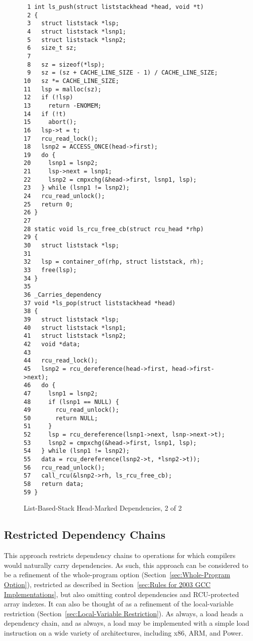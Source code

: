 \documentclass[letterpaper,twocolumn,10pt]{article}
\begin{document}
\begin{figure}[tbp]
{ \scriptsize
\begin{verbatim}
 1 int ls_push(struct liststackhead *head, void *t)
 2 {
 3   struct liststack *lsp;
 4   struct liststack *lsnp1;
 5   struct liststack *lsnp2;
 6   size_t sz;
 7 
 8   sz = sizeof(*lsp);
 9   sz = (sz + CACHE_LINE_SIZE - 1) / CACHE_LINE_SIZE;
10   sz *= CACHE_LINE_SIZE;
11   lsp = malloc(sz);
12   if (!lsp)
13     return -ENOMEM;
14   if (!t)
15     abort();
16   lsp->t = t;
17   rcu_read_lock();
18   lsnp2 = ACCESS_ONCE(head->first);
19   do {
20     lsnp1 = lsnp2;
21     lsp->next = lsnp1;
22     lsnp2 = cmpxchg(&head->first, lsnp1, lsp);
23   } while (lsnp1 != lsnp2);
24   rcu_read_unlock();
25   return 0;
26 }
27 
28 static void ls_rcu_free_cb(struct rcu_head *rhp)
29 {
30   struct liststack *lsp;
31 
32   lsp = container_of(rhp, struct liststack, rh);
33   free(lsp);
34 }
35 
36 _Carries_dependency
37 void *ls_pop(struct liststackhead *head)
38 {
39   struct liststack *lsp;
40   struct liststack *lsnp1;
41   struct liststack *lsnp2;
42   void *data;
43 
44   rcu_read_lock();
45   lsnp2 = rcu_dereference(head->first, head->first->next);
46   do {
47     lsnp1 = lsnp2;
48     if (lsnp1 == NULL) {
49       rcu_read_unlock();
50       return NULL;
51     }
52     lsp = rcu_dereference(lsnp1->next, lsnp->next->t);
53     lsnp2 = cmpxchg(&head->first, lsnp1, lsp);
54   } while (lsnp1 != lsnp2);
55   data = rcu_dereference(lsnp2->t, *lsnp2->t));
56   rcu_read_unlock();
57   call_rcu(&lsnp2->rh, ls_rcu_free_cb);
58   return data;
59 }
\end{verbatim}
}
\caption{List-Based-Stack Head-Marked Dependencies, 2 of 2}
\label{fig:List-Based-Stack Head-Marked Dependencies, 2 of 2}
\end{figure}

\subsection{Restricted Dependency Chains}
\label{sec:Restricted Dependency Chains}

This approach restricts dependency chains to operations for which
compilers would naturally carry dependencies.
As such, this approach can be considered to be a refinement of
the whole-program option (Section~\ref{sec:Whole-Program Option}),
restricted as described in
Section~\ref{sec:Rules for 2003 GCC Implementations},
but also omitting control dependencies and RCU-protected array indexes.
It can also be thought of as a refinement of the local-variable
restriction
(Section~\ref{sec:Local-Variable Restriction}).
As always, a  load heads a dependency chain,
and as always, a  load may be implemented
with a simple load instruction on a wide variety of architectures,
including x86, ARM, and Power.
\end{document}
